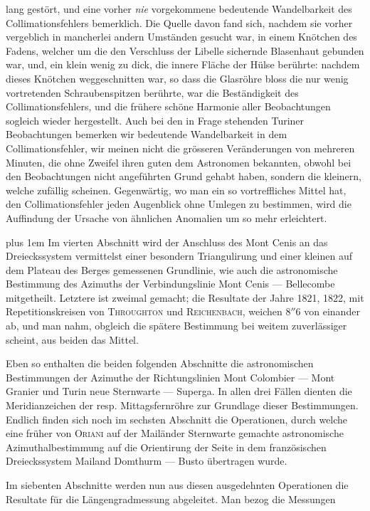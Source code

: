 %
lang gestört, und eine vorher \textit{nie} vorgekommene bedeutende Wandelbarkeit des Collimationsfehlers bemerklich. Die Quelle davon fand sich, nachdem sie vorher vergeblich in mancherlei andern Umständen gesucht war, in einem Knötchen des Fadens, welcher um die den Verschluss der Libelle sichernde Blasenhaut gebunden war, und, ein klein wenig zu dick, die innere Fläche der Hülse berührte: nachdem dieses Knötchen weggeschnitten war, so dass die Glasröhre bloss die nur wenig vortretenden Schraubenspitzen berührte, war die Beständigkeit des Collimationsfehlers, und die frühere schöne Harmonie aller Beobachtungen sogleich wieder hergestellt. Auch bei den in Frage stehenden Turiner Beobachtungen bemerken wir bedeutende Wandelbarkeit in dem Collimationsfehler, wir meinen nicht die grösseren Veränderungen von mehreren Minuten, die ohne Zweifel ihren guten dem Astronomen bekannten, obwohl bei den Beobachtungen nicht angeführten Grund gehabt haben, sondern die kleinern, welche zufällig scheinen. Gegenwärtig, wo man ein so vortreffliches Mittel hat, den Collimationsfehler jeden Augenblick ohne Umlegen zu bestimmen, wird die Auffindung der Ursache von ähnlichen Anomalien um so mehr erleichtert.

\begingroup\rightskip=0pt plus 1em
Im vierten Abschnitt wird der Anschluss des Mont Cenis an das Dreieckssystem vermittelst einer besondern Triangulirung und einer kleinen auf dem Plateau des Berges gemessenen Grundlinie, wie auch die astronomische Bestimmung des Azimuths der Verbindungslinie Mont Cenis --- Bellecombe mitgetheilt. Letztere ist zweimal gemacht; die Resultate der Jahre 1821, 1822, mit Repetitionskreisen von \textsc{Throughton} und \textsc{Reichenbach}, weichen \(8''6\) von einander ab, und man nahm, obgleich die spätere Bestimmung bei weitem zuverlässiger scheint, aus beiden das Mittel.\par
\endgroup

Eben so enthalten die beiden folgenden Abschnitte die astronomischen Bestimmungen der Azimuthe der Richtungslinien Mont Colombier --- Mont Granier und Turin neue Sternwarte --- Superga. In allen drei Fällen dienten die Meridianzeichen der resp. Mittagsfernröhre zur Grundlage dieser Bestimmungen. Endlich finden sich noch im sechsten Abschnitt die Operationen, durch welche eine früher von \textsc{Oriani} auf der Mailänder Sternwarte gemachte astronomische Azimuthalbestimmung auf die Orientirung der Seite in dem französischen Dreieckssystem Mailand Domthurm --- Busto übertragen wurde.

Im siebenten Abschnitte werden nun aus diesen ausgedehnten Operationen die Resultate für die Längengradmessung abgeleitet. Man bezog die Messungen
